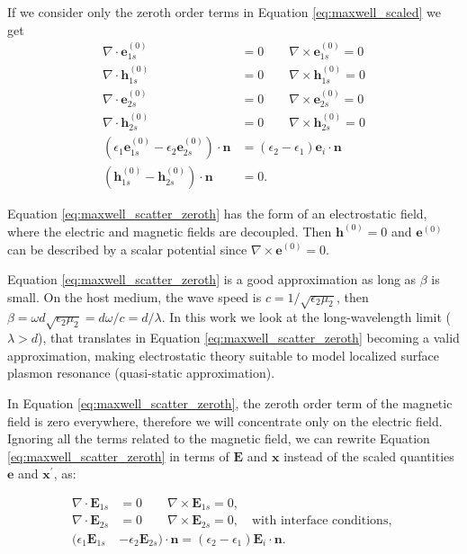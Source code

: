  If we consider only the zeroth order terms in Equation \eqref{eq:maxwell_scaled} we get
 \begin{align} \label{eq:maxwell_scatter_zeroth}
 \nabla \cdot \mathbf{e}^{(0)}_{1s} &= 0 \qquad \nabla \times \mathbf{e}^{(0)}_{1s} = 0 \nonumber \\
 \nabla \cdot \mathbf{h}^{(0)}_{1s} &= 0 \qquad \nabla \times \mathbf{h}^{(0)}_{1s} = 0 \nonumber \\
 \nabla \cdot \mathbf{e}^{(0)}_{2s} &= 0 \qquad \nabla \times \mathbf{e}^{(0)}_{2s} = 0 \nonumber \\
 \nabla \cdot \mathbf{h}^{(0)}_{2s} &= 0 \qquad \nabla \times \mathbf{h}^{(0)}_{2s} = 0 \nonumber \\
 (\epsilon_1\mathbf{e}^{(0)}_{1s} - \epsilon_2\mathbf{e}^{(0)}_{2s})\cdot\mathbf{n} &= (\epsilon_2-\epsilon_1)\mathbf{e}_i\cdot \mathbf{n} \nonumber \\(\mathbf{h}^{(0)}_{1s} - \mathbf{h}^{(0)}_{2s})\cdot \mathbf{n}&=0.
 \end{align}

Equation \eqref{eq:maxwell_scatter_zeroth} has the form of an electrostatic field, where the electric
and magnetic fields are decoupled. Then $\mathbf{h}^{(0)}=0$ and $\mathbf{e}^{(0)}$ can be described by a
scalar potential since $\nabla \times \mathbf{e}^{(0)}=0$.
 
Equation \eqref{eq:maxwell_scatter_zeroth} is a good approximation as long as $\beta$ is small. On the host medium, the wave 
speed is $c=1/\sqrt{\epsilon_2\mu_2}$, then $\beta=\omega d \sqrt{\epsilon_2\mu_2} = d\omega/c  = d/\lambda$. In this work
we look at the long-wavelength limit ($\lambda > d$), that translates in Equation \eqref{eq:maxwell_scatter_zeroth} becoming
a valid approximation, making electrostatic theory suitable to model localized surface plasmon resonance (quasi-static approximation).

In Equation \eqref{eq:maxwell_scatter_zeroth}, the zeroth order term of the magnetic field is zero
everywhere, therefore we will concentrate only on the electric field. Ignoring all the terms related 
to the magnetic field, we can rewrite Equation \eqref{eq:maxwell_scatter_zeroth} in terms of 
$\mathbf{E}$ and $\mathbf{x}$ instead of the scaled quantities $\mathbf{e}$ and
$\mathbf{x}^\prime$, as:

\begin{align} \label{eq:electrostatic_scatter_E}
\nabla \cdot \mathbf{E}_{1s} &= 0 \qquad \nabla \times \mathbf{E}_{1s} = 0, \nonumber \\
\nabla \cdot \mathbf{E}_{2s} &= 0 \qquad \nabla \times \mathbf{E}_{2s} = 0, \nonumber \quad
\text{with interface conditions, } \nonumber \\
(\epsilon_1\mathbf{E}_{1s} &- \epsilon_2\mathbf{E}_{2s})\cdot\mathbf{n} = (\epsilon_2-\epsilon_1)\mathbf{E}_i\cdot \mathbf{n}.
\end{align}

